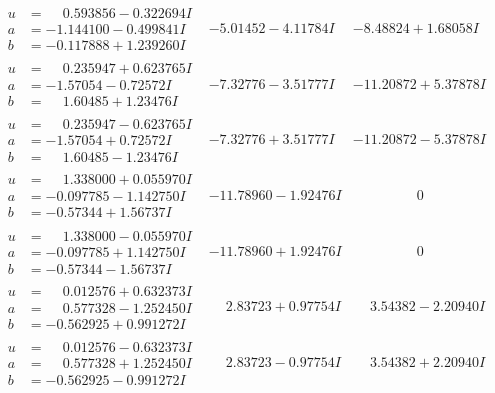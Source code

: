 \documentclass[1p]{elsarticle_modified}
\theoremstyle{definition}
\begin{document}
$$\begin{array}{c|c|c}
\begin{aligned}
u &= \phantom{-}0.593856 - 0.322694 I \\
a &= -1.144100 - 0.499841 I \\
b &= -0.117888 + 1.239260 I\end{aligned}
 & -5.01452 - 4.11784 I & -8.48824 + 1.68058 I \\ \hline\begin{aligned}
u &= \phantom{-}0.235947 + 0.623765 I \\
a &= -1.57054 - 0.72572 I \\
b &= \phantom{-}1.60485 + 1.23476 I\end{aligned}
 & -7.32776 - 3.51777 I & -11.20872 + 5.37878 I \\ \hline\begin{aligned}
u &= \phantom{-}0.235947 - 0.623765 I \\
a &= -1.57054 + 0.72572 I \\
b &= \phantom{-}1.60485 - 1.23476 I\end{aligned}
 & -7.32776 + 3.51777 I & -11.20872 - 5.37878 I \\ \hline\begin{aligned}
u &= \phantom{-}1.338000 + 0.055970 I \\
a &= -0.097785 - 1.142750 I \\
b &= -0.57344 + 1.56737 I\end{aligned}
 & -11.78960 - 1.92476 I & \phantom{-0.000000 } 0 \\ \hline\begin{aligned}
u &= \phantom{-}1.338000 - 0.055970 I \\
a &= -0.097785 + 1.142750 I \\
b &= -0.57344 - 1.56737 I\end{aligned}
 & -11.78960 + 1.92476 I & \phantom{-0.000000 } 0 \\ \hline\begin{aligned}
u &= \phantom{-}0.012576 + 0.632373 I \\
a &= \phantom{-}0.577328 - 1.252450 I \\
b &= -0.562925 + 0.991272 I\end{aligned}
 & \phantom{-}2.83723 + 0.97754 I & \phantom{-}3.54382 - 2.20940 I \\ \hline\begin{aligned}
u &= \phantom{-}0.012576 - 0.632373 I \\
a &= \phantom{-}0.577328 + 1.252450 I \\
b &= -0.562925 - 0.991272 I\end{aligned}
 & \phantom{-}2.83723 - 0.97754 I & \phantom{-}3.54382 + 2.20940 I \\ \hline\begin{aligned}

\end{aligned}
\end{array}$$
\end{document}
